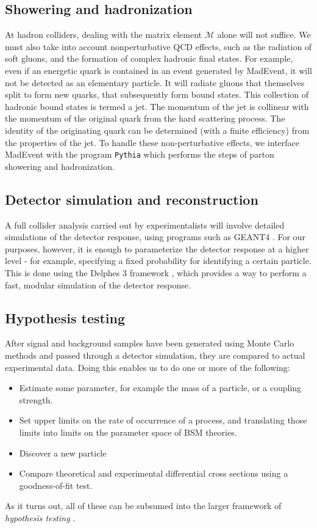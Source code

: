 \subsection{Showering and hadronization}
At hadron colliders, dealing with the matrix element $\mathcal{M}$ alone will not suffice. We must also take into account nonperturbative QCD effects, such as the radiation of soft gluons, and the formation of complex hadronic final states. For example, even if an energetic quark is contained in an event generated by MadEvent, it will not be detected as an elementary particle. It will radiate gluons that themselves split to form new quarks, that subsequently form bound states. This collection of hadronic bound states is termed a jet. The momentum of the jet is collinear with the momentum of the original quark from the hard scattering process. The identity of the originating quark can be determined (with a finite efficiency) from the properties of the jet. To handle these non-perturbative effects, we interface MadEvent with the program \texttt{Pythia}\citep{Sjostrand2006} which performs the steps of parton showering and hadronization.
\subsection{Detector simulation and reconstruction}
A full collider analysis carried out by experimentalists will involve detailed simulations of the detector response, using programs such as GEANT4 \citep{Agostinelli2003}. For our purposes, however, it is enough to parameterize the detector response at a higher level - for example, specifying a fixed probability for identifying a certain particle. This is done using the Delphes 3 framework \citep{DeFavereau2014a}, which provides a way to perform a fast, modular simulation of the detector response. 
\subsection{Hypothesis testing}
After signal and background samples have been generated using Monte Carlo methods and passed through a detector simulation, they are compared to actual experimental data. Doing this enables us to do one or more of the following:
\begin{itemize}
  \item Estimate some parameter, for example the mass of a particle, or a coupling strength.
  \item Set upper limits on the rate of occurrence of a process, and translating those limits into limits on the parameter space of BSM theories.
  \item Discover a new particle
  \item Compare theoretical and experimental differential cross sections using a goodness-of-fit test.
\end{itemize}
As it turns out, all of these can be subsumed into the larger framework of \emph{hypothesis testing} \citep{Heinrich}.

